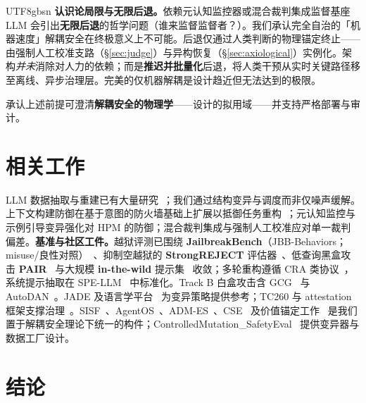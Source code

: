 \documentclass[letterpaper,twocolumn,10pt]{article}
\begin{document}
\begin{CJK}{UTF8}{gbsn}
\textbf{认识论局限与无限后退。}依赖元认知监控器或混合裁判集成监督基座 LLM 会引出\textbf{无限后退}的哲学问题（谁来监督监督者？）。我们承认完全自治的「机器速度」解耦安全在终极意义上不可能。后退仅通过人类判断的物理锚定终止——由强制人工校准支路（\S\ref{sec:judge}）与异构恢复（\S\ref{sec:axiological}）实例化。架构\emph{并未}消除对人力的依赖；而是\textbf{推迟并批量化}后退，将人类干预从实时关键路径移至离线、异步治理层。完美的仅机器解耦是设计趋近但无法达到的极限。

承认上述前提可澄清\textbf{解耦安全的物理学}——设计的拟用域——并支持严格部署与审计。

\section{相关工作}

LLM 数据抽取与重建已有大量研究~\cite{llm-reconstruction-emergent,split-ft-attack,active-reconstruction}；我们通过结构变异与调度而非仅噪声缓解。上下文构建防御在基于意图的防火墙基础上扩展以抵御任务重构~\cite{agentos-arxiv}；元认知监控与示例引导变异强化对 HPM 的防御；混合裁判集成与强制人工校准应对单一裁判偏差。\textbf{基准与社区工件。}越狱评测已围绕 \textbf{JailbreakBench}（JBB-Behaviors；misuse/良性对照）~\cite{jailbreakbench}、抑制空越狱的 \textbf{StrongREJECT} 评估器~\cite{strongreject}、低查询黑盒攻击 \textbf{PAIR}~\cite{pair-jailbreak} 与大规模 \textbf{in-the-wild} 提示集~\cite{wild-jailbreak-prompts} 收敛；多轮重构遵循 CRA 类协议~\cite{cra-reconstruction}，系统提示抽取在 SPE-LLM~\cite{spe-llm} 中标准化。Track B 白盒攻击含 GCG~\cite{gcg} 与 AutoDAN~\cite{autodan}。JADE 及语言学平台~\cite{jade-linguistics,jade-db} 为变异策略提供参考；TC260 与 attestation 框架支撑治理~\cite{tc260-governance,tc260-training-data,dual-use-attestations}。SISF~\cite{sisf-arxiv}、AgentOS~\cite{agentos-arxiv}、ADM-ES~\cite{adm-es-arxiv}、CSE~\cite{cse-arxiv} 及价值锚定工作~\cite{epistemic-grounding,hpm-jailbreak} 是我们置于解耦安全理论下统一的构件；ControlledMutation\_SafetyEval~\cite{ControlledMutation_SafetyEval} 提供变异器与数据工厂设计。

\section{结论}


\end{CJK}
\end{document}
